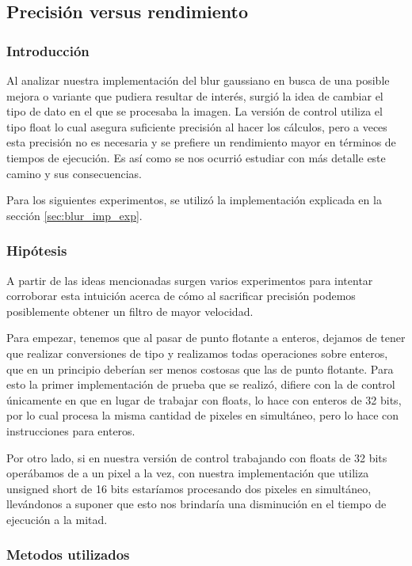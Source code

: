 \subsection{Precisión versus rendimiento}
\label{subsec:resultados2}

\subsubsection{Introducción}

Al analizar nuestra implementación del blur gaussiano en busca de una posible
mejora o variante que pudiera resultar de interés, surgió la idea de cambiar el
tipo de dato en el que se procesaba la imagen. La versión de control utiliza
el tipo float lo cual asegura suficiente precisión al hacer los cálculos, pero a
veces esta precisión no es necesaria y se prefiere un rendimiento mayor en
términos de tiempos de ejecución. Es así como se nos ocurrió estudiar con más
detalle este camino y sus consecuencias.

Para los siguientes experimentos, se utilizó la implementación explicada en la
sección \ref{sec:blur_imp_exp}.

\subsubsection{Hipótesis}

A partir de las ideas mencionadas surgen varios experimentos para intentar
corroborar esta intuición acerca de cómo al sacrificar precisión podemos
posiblemente obtener un filtro de mayor velocidad.

Para empezar, tenemos que al pasar de punto flotante a enteros, dejamos de
tener que realizar conversiones de tipo y realizamos todas operaciones sobre
enteros, que en un principio deberían ser menos costosas que las de punto
flotante. Para esto la primer implementación de prueba que se realizó, difiere
con la de control únicamente en que en lugar de trabajar con floats, lo hace con
enteros de 32 bits, por lo cual procesa la misma cantidad de pixeles en
simultáneo, pero lo hace con instrucciones para enteros.

Por otro lado, si en nuestra versión de control trabajando con floats de 32 bits
operábamos de a un pixel a la vez, con nuestra implementación que utiliza
unsigned short de 16 bits estaríamos procesando dos pixeles en
simultáneo, llevándonos a suponer que esto nos brindaría una disminución en el
tiempo de ejecución a la mitad.

\subsubsection{Metodos utilizados}

